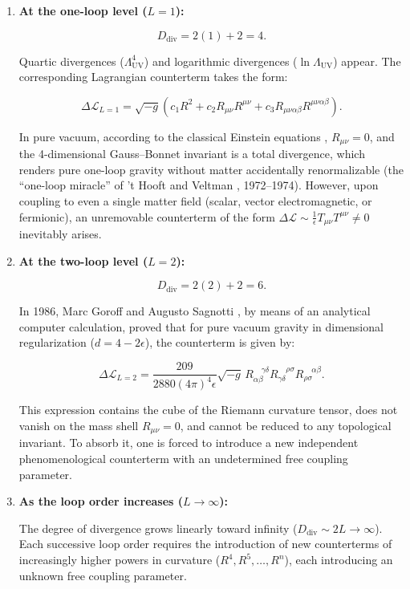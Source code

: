 \begin{enumerate}
\item \textbf{At the one-loop level ($L = 1$):}

\begin{equation*}
D_{\text{div}} = 2(1) + 2 = 4.
\end{equation*}

Quartic divergences ($\Lambda_{\text{UV}}^4$) and logarithmic divergences ($\ln \Lambda_{\text{UV}}$) appear. The corresponding Lagrangian counterterm takes the form:

\begin{equation*}
\Delta \mathcal{L}_{L=1} = \sqrt{-g} \left( c_1 R^2 + c_2 R_{\mu\nu} R^{\mu\nu} + c_3 R_{\mu\nu\alpha\beta} R^{\mu\nu\alpha\beta} \right).
\end{equation*}

In pure vacuum, according to the classical Einstein equations \cite{ref1}, $R_{\mu\nu} = 0$, and the 4-dimensional Gauss--Bonnet invariant is a total divergence, which renders pure one-loop gravity without matter accidentally renormalizable (the ``one-loop miracle'' of 't Hooft and Veltman \cite{ref2}, 1972--1974). However, upon coupling to even a single matter field (scalar, vector electromagnetic, or fermionic), an unremovable counterterm of the form $\Delta\mathcal{L} \sim \frac{1}{\epsilon} T_{\mu\nu} T^{\mu\nu} \ne 0$ inevitably arises.

\item \textbf{At the two-loop level ($L = 2$):}

\begin{equation*}
D_{\text{div}} = 2(2) + 2 = 6.
\end{equation*}

In 1986, Marc Goroff and Augusto Sagnotti \cite{ref3}, by means of an analytical computer calculation, proved that for pure vacuum gravity in dimensional regularization ($d = 4 - 2\epsilon$), the counterterm is given by:

\begin{equation*}
\Delta \mathcal{L}_{L=2} = \frac{209}{2880 (4\pi)^4 \epsilon} \sqrt{-g} \, R_{\alpha\beta}^{\quad\gamma\delta} R_{\gamma\delta}^{\quad\rho\sigma} R_{\rho\sigma}^{\quad\alpha\beta}.
\end{equation*}

This expression contains the cube of the Riemann curvature tensor, does not vanish on the mass shell $R_{\mu\nu} = 0$, and cannot be reduced to any topological invariant. To absorb it, one is forced to introduce a new independent phenomenological counterterm with an undetermined free coupling parameter.

\item \textbf{As the loop order increases ($L \to \infty$):}

The degree of divergence grows linearly toward infinity ($D_{\text{div}} \sim 2L \to \infty$). Each successive loop order requires the introduction of new counterterms of increasingly higher powers in curvature ($R^4, R^5, \dots, R^n$), each introducing an unknown free coupling parameter.
\end{enumerate}

